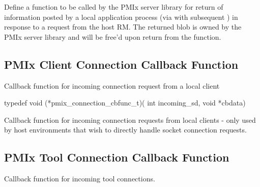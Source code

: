 \begin{arglist}
\end{arglist}


\descr
Define a function to be called by the PMIx server library for return of information posted by a local application process (via  with subsequent ) in response to a request from the host RM. The returned  blob is owned by the PMIx server library and will be free’d upon return from the function.

\subsection{PMIx Client Connection Callback Function}

\summary

Callback function for incoming connection request from a local client

\format

\cspecificstart
\begin{codepar}
typedef void (*pmix_connection_cbfunc_t)(
                             int incoming_sd, void *cbdata)
\end{codepar}
\cspecificend

\begin{arglist}
\end{arglist}

\descr

Callback function for incoming connection requests from local clients - only used by host environments that wish to directly handle socket connection requests.


\subsection{PMIx Tool Connection Callback Function}

\summary

Callback function for incoming tool connections.

